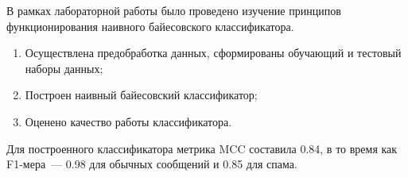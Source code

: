 
В рамках лабораторной работы было проведено изучение принципов функционирования наивного байесовского классификатора.

\begin{enumerate}[label*=\arabic*.]
	\item Осуществлена предобработка данных, сформированы обучающий и тестовый наборы данных;
	\item Построен наивный байесовский классификатор;
	\item Оценено качество работы классификатора.
\end{enumerate}

Для построенного классификатора метрика MCC составила 0.84, в то время как F1-мера~--- 0.98 для обычных сообщений и 0.85 для спама.
